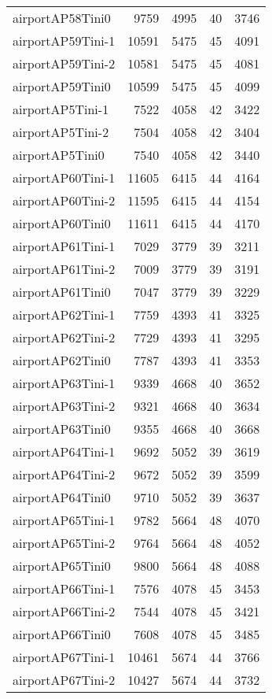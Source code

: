 \begin{longtable}{lrrrr}
airportAP58Tini0 & 9759 & 4995 & 40 & 3746 \\
airportAP59Tini-1 & 10591 & 5475 & 45 & 4091 \\
airportAP59Tini-2 & 10581 & 5475 & 45 & 4081 \\
airportAP59Tini0 & 10599 & 5475 & 45 & 4099 \\
airportAP5Tini-1 & 7522 & 4058 & 42 & 3422 \\
airportAP5Tini-2 & 7504 & 4058 & 42 & 3404 \\
airportAP5Tini0 & 7540 & 4058 & 42 & 3440 \\
airportAP60Tini-1 & 11605 & 6415 & 44 & 4164 \\
airportAP60Tini-2 & 11595 & 6415 & 44 & 4154 \\
airportAP60Tini0 & 11611 & 6415 & 44 & 4170 \\
airportAP61Tini-1 & 7029 & 3779 & 39 & 3211 \\
airportAP61Tini-2 & 7009 & 3779 & 39 & 3191 \\
airportAP61Tini0 & 7047 & 3779 & 39 & 3229 \\
airportAP62Tini-1 & 7759 & 4393 & 41 & 3325 \\
airportAP62Tini-2 & 7729 & 4393 & 41 & 3295 \\
airportAP62Tini0 & 7787 & 4393 & 41 & 3353 \\
airportAP63Tini-1 & 9339 & 4668 & 40 & 3652 \\
airportAP63Tini-2 & 9321 & 4668 & 40 & 3634 \\
airportAP63Tini0 & 9355 & 4668 & 40 & 3668 \\
airportAP64Tini-1 & 9692 & 5052 & 39 & 3619 \\
airportAP64Tini-2 & 9672 & 5052 & 39 & 3599 \\
airportAP64Tini0 & 9710 & 5052 & 39 & 3637 \\
airportAP65Tini-1 & 9782 & 5664 & 48 & 4070 \\
airportAP65Tini-2 & 9764 & 5664 & 48 & 4052 \\
airportAP65Tini0 & 9800 & 5664 & 48 & 4088 \\
airportAP66Tini-1 & 7576 & 4078 & 45 & 3453 \\
airportAP66Tini-2 & 7544 & 4078 & 45 & 3421 \\
airportAP66Tini0 & 7608 & 4078 & 45 & 3485 \\
airportAP67Tini-1 & 10461 & 5674 & 44 & 3766 \\
airportAP67Tini-2 & 10427 & 5674 & 44 & 3732 \\

\end{longtable}
